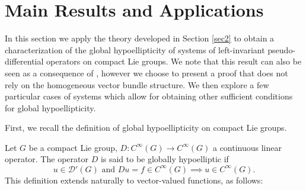 \documentclass[11pt]{amsart}
\numberwithin{theorem}{section}
\numberwithin{equation}{section}
\newtheorem{prop}[theorem]{Proposition}
\theoremstyle{definition}
\numberwithin{example}{section}
\theoremstyle{definition}
\theoremstyle{definition}
\newcommand{\C}{\mathbb{C}}
\newcommand{\HS}{\operatorname{HS}}
\begin{document}



\section{Main Results and Applications}\label{sec3}

In this section we apply the theory developed in Section \ref{sec2} to obtain a characterization of the global hypoellipticity of systems of left-invariant pseudo-differential operators on compact Lie groups. We note that this result can also be seen as a consequence of \cite[Theorem 3.2]{CardKow}, however we choose to present a proof that does not rely on the homogeneous vector bundle structure.  We then explore a few particular cases of systems which allow for obtaining other sufficient conditions for global hypoellipticity.

\noindent First, we recall the definition of global hypoellipticity on compact Lie groups.

Let $G$ be a compact Lie group, $D:C^\infty(G)\to C^\infty(G)$ a continuous linear operator. The operator $D$ is said to be globally hypoelliptic if
$$u\in\mathcal{D}'(G)\text{ and } Du=f\in C^\infty(G)\implies u\in C^\infty(G).$$
\noindent This definition extends naturally to vector-valued functions, as follows:
\end{document}
